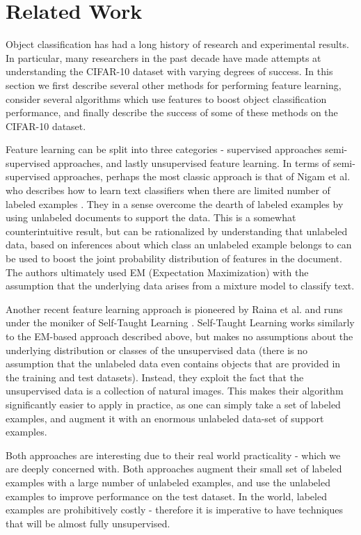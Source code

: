 \documentclass{article} %
\begin{document}
\section{Related Work}

Object classification has had a long history of research and experimental results. In
particular, many researchers in the past decade have made attempts at understanding the
CIFAR-10 dataset with varying degrees of success. In this section we first describe
several other methods for performing feature learning, consider several algorithms which
use features to boost object classification performance, and finally describe the success
of some of these methods on the CIFAR-10 dataset.

Feature learning can be split into three categories - supervised approaches
semi-supervised approaches, and lastly unsupervised feature learning.
In terms of semi-supervised approaches, perhaps the most classic approach is that of
Nigam et al. who describes how to
learn text classifiers when there are limited number of labeled examples \cite{nigam}.
They in a sense
overcome the dearth of labeled examples by using unlabeled documents to support the data.
This is a somewhat counterintuitive result, but can be rationalized by understanding that
unlabeled data, based on inferences about which class an unlabeled example belongs to can
be used to boost the joint probability distribution of features in the document. The authors
ultimately used EM (Expectation Maximization) with the assumption that the underlying data
arises from a mixture model to classify text.

Another recent feature learning approach is pioneered by Raina et al. and runs under the
moniker of Self-Taught Learning \cite{raina}. Self-Taught Learning works similarly to
the EM-based
approach described above, but makes no assumptions about the underlying distribution or
classes of the unsupervised data (there is no assumption that the unlabeled data even
contains objects that are provided in the training and test datasets). Instead, they exploit
the fact that the unsupervised data is a collection of natural images. This makes their
algorithm significantly easier to apply in practice, as one can simply take a set of labeled
examples, and augment it with an enormous unlabeled data-set of support examples.

Both approaches are interesting due to their real world practicality - which we are deeply
concerned with. Both approaches augment their small set of labeled examples with a large
number of unlabeled examples, and use the unlabeled examples to improve performance on the
test dataset. In the world, labeled examples are prohibitively costly -
therefore it is imperative to have techniques that will be almost fully unsupervised.
\end{document}
